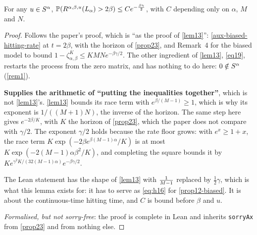 \begin{lemma}
  \label{lem28}
  \leanok
  For any $u \in S^\alpha$,
  $\mathbb{P}(R^{\alpha,\beta,u}(L_\alpha) > 2\beta) \le C e^{-\frac{\beta\gamma}{2}}$,
  with $C$ depending only on $\alpha$, $M$ and $N$.
\end{lemma}
\begin{proof}
  \leanok
  Follows the paper's proof, which is ``as the proof of \ref{lem13}'':
  \ref{aux-biased-hitting-rate} at $t = 2\beta$, with the horizon of
  \ref{prop23}, and Remark~4 for the biased model to bound
  $1 - \zeta_{\alpha,\beta}^K \le K MN e^{-\beta\gamma/2}$.  The other
  ingredient of \ref{lem13}, \ref{eq19}, restarts the process from the zero
  matrix, and has nothing to do here: $0 \notin S^\alpha$ (\ref{rem1}).

  \textbf{Supplies the arithmetic of ``putting the inequalities together''},
  which is not \ref{lem13}'s.  \ref{lem13} bounds its race term with
  $e^{\beta/(M-1)} \ge 1$, which is why its exponent is $1/((M+1)N)$, the
  inverse of the horizon.  The same step here gives $e^{-2\beta/K}$, with $K$
  the horizon of \ref{prop23}, which the paper does not compare with
  $\gamma/2$.  The exponent $\gamma/2$ holds because the rate floor grows: with
  $e^x \ge 1 + x$, the race term $K \exp(-2\beta e^{\beta(M-1)\alpha}/K)$ is at
  most $K \exp(-2(M-1)\alpha\beta^2/K)$, and completing the square bounds it by
  $K e^{\gamma^2 K / (32 (M-1)\alpha)} e^{-\beta\gamma/2}$.

  The Lean statement has the shape of \ref{lem13} with $\tfrac{1}{M-1}$ replaced by
  $\tfrac{1}{2}\gamma$, which is what this lemma exists for: it has to serve as
  \eqref{eq:h16} for \ref{prop12-biased}.  It is about the continuous-time
  hitting time, and $C$ is bound before $\beta$ and $u$.

  \emph{Formalised, but not sorry-free}: the proof is complete in Lean and
  inherits \texttt{sorryAx} from \ref{prop23} and from nothing else.
\end{proof}

